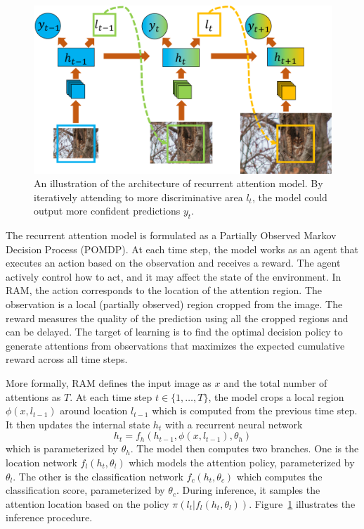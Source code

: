 \documentclass[10pt,twocolumn,letterpaper]{article}
\begin{document}
\setlength{\tabcolsep}{1pt}
\begin{figure}
\begin{center}
  \includegraphics[width=0.95\linewidth]{figs/model/ram.pdf}
\end{center}
\caption{An illustration of the architecture of recurrent attention model. By iteratively attending to more discriminative area $l_t$, the model could output more confident predictions $y_t$.}
\label{fig:ram}
\end{figure}

The recurrent attention model is formulated as a Partially Observed Markov Decision Process (POMDP).
At each time step, the model works as an agent that executes an action based on the observation and receives a reward.
The agent actively control how to act, and it may affect the state of the environment.
In RAM, the action corresponds to the location of the attention region.
The observation is a local (partially observed) region cropped from the image.
The reward measures the quality of the prediction using all the cropped regions and can be delayed.
The target of learning is to find the optimal decision policy to generate attentions from observations that maximizes the expected cumulative reward across all time steps.

More formally, RAM defines the input image as $x$ and the total number of attentions as $T$.
At each time step $t \in \{1, \ldots, T\}$, the model crops a local region $\phi(x, l_{t-1})$ around location $l_{t-1}$ which is computed from the previous time step.
It then updates the internal state $h_t$ with a recurrent neural network
\begin{equation}
  h_t = f_h(h_{t-1}, \phi(x, l_{t-1}), \theta_h)
\end{equation}
which is parameterized by $\theta_h$.
The model then computes two branches.
One is the location network $f_l(h_t, \theta_l)$ which models the attention policy, parameterized by $\theta_l$.
The other is the classification network $f_c(h_t, \theta_c)$ which computes the classification score, parameterized by $\theta_c$.
During inference, it samples the attention location based on the policy $\pi(l_t | f_l(h_t, \theta_l))$. Figure~\ref{fig:ram} illustrates the inference procedure.
\end{document}
